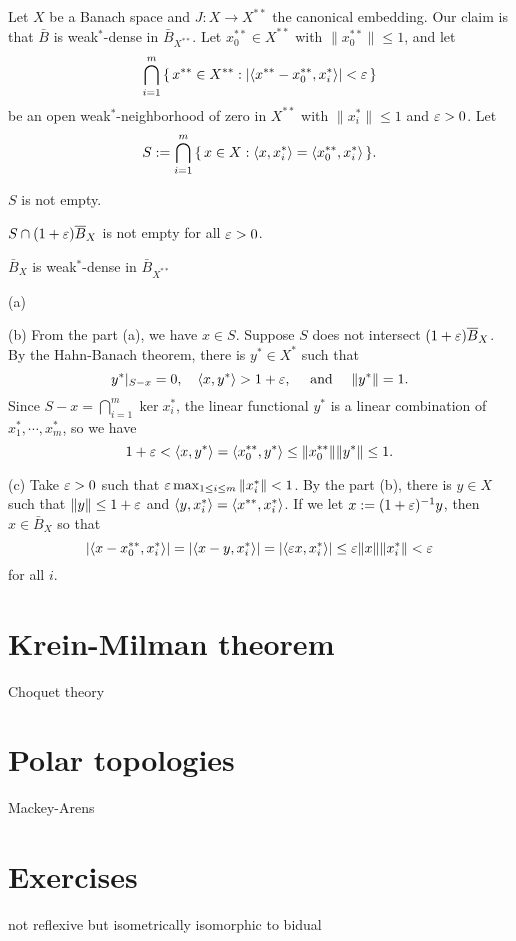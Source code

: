 \documentclass{../../large}
\begin{document}
\begin{prb}
Let $X$ be a Banach space and $J:X\to X^{**}$ the canonical embedding.
Our claim is that $\bar B$ is weak$^*$-dense in $\bar B_{X^{**}}$.
Let $x_0^{**}\in X^{**}$ with $\|x_0^{**}\|\le1$, and let
\[\bigcap_{i=1}^m\,\{\,x^{**}\in X^{**}:|\langle x^{**}-x_0^{**},x_i^*\rangle|<\varepsilon\,\}\]
be an open weak$^*$-neighborhood of zero in $X^{**}$ with $\|x_i^*\|\le1$ and $\varepsilon>0$.
Let
\[S:=\bigcap_{i=1}^m\,\{\,x\in X:\langle x,x_i^*\rangle=\langle x_0^{**},x_i^*\rangle\,\}.\]
\begin{parts}
\item $S$ is not empty.
\item $S\cap(1+\varepsilon)\overline B_X$ is not empty for all $\varepsilon>0$.
\item $\bar B_X$ is weak$^*$-dense in $\bar B_{X^{**}}$
\end{parts}
\end{prb}
\begin{pf}
(a)

(b)
From the part (a), we have $x\in S$.
Suppose $S$ does not intersect $(1+\varepsilon)\overline B_X$.
By the Hahn-Banach theorem, there is $y^*\in X^*$ such that
\[y^*|_{S-x}=0,\quad\langle x,y^*\rangle>1+\varepsilon,\quad\text{ and }\quad\|y^*\|=1.\]
Since $S-x=\bigcap_{i=1}^m\ker x_i^*$, the linear functional $y^*$ is a linear combination of $x_1^*,\cdots,x_m^*$, so we have
\[1+\varepsilon<\langle x,y^*\rangle=\langle x_0^{**},y^*\rangle\le\|x_0^{**}\|\|y^*\|\le1.\]

(c)
Take $\varepsilon>0$ such that $\varepsilon\max_{1\le i\le m}\|x_i^*\|<1$.
By the part (b), there is $y\in X$ such that $\|y\|\le1+\varepsilon$ and $\langle y,x_i^*\rangle=\langle x^{**},x_i^*\rangle$.
If we let $x:=(1+\varepsilon)^{-1}y$, then $x\in\bar B_X$ so that
\[|\langle x-x_0^{**},x_i^*\rangle|=|\langle x-y,x_i^*\rangle|=|\langle\varepsilon x,x_i^*\rangle|\le\varepsilon\|x\|\|x_i^*\|<\varepsilon\]
for all $i$.
\end{pf}




\section{Krein-Milman theorem}
Choquet theory


\section{Polar topologies}
Mackey-Arens


\section*{Exercises}
\begin{prb}
not reflexive but isometrically isomorphic to bidual
\end{prb}
\end{document}
